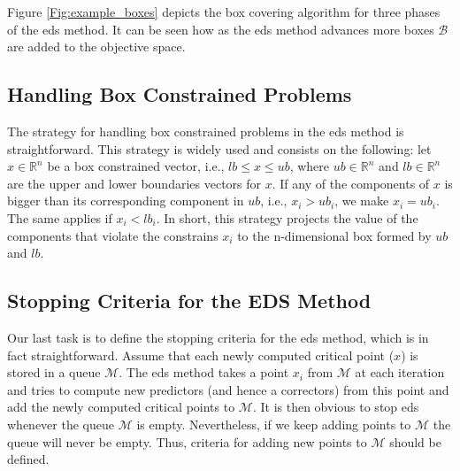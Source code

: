 Figure \ref{Fig:example_boxes} depicts the box covering algorithm for three phases of the eds method. It can be seen how as the \gls{eds} method advances more boxes $\mathcal{B}$ are added to the objective space.

\begin{comment}

\begin{figure}[H]
\hspace*{-1cm}
    \subfloat[Box set for 300th iteration \label{Fig:boxes1}]{%
    	\centering \texttt{[image: img/boxes1.png]}
    }
    \subfloat[Box set for 600th iteration \label{Fig:boxes2}]{%
    	\centering \texttt{[image: img/boxes2.png]}
    }
    \subfloat[Box set for end of the method\label{Fig:boxes3}]{%
    	\centering \texttt{[image: img/boxes3.png]}
    }
    \caption{Box set for different stages of the method}
    \label{Fig:example_boxes}
\end{figure}

\end{comment}

\subsection{Handling Box Constrained Problems}
\label{sec:box_constraints}

The strategy for handling box constrained problems in the \gls{eds} method is straightforward. This strategy is widely used and consists on the following: let $x \in \mathbb{R}^n$ be a box constrained vector, i.e., $lb \leq x \leq ub$, where $ub \in\mathbb{R}^n$ and $lb \in \mathbb{R}^n$ are the upper and lower boundaries vectors for $x$. If any of the components of $x$ is bigger than its corresponding component in $ub$, i.e., $x_i > ub_i$, we make $x_i = ub_i$. The same applies if $x_i < lb_i$. In short, this strategy projects the value of the components that violate the constrains $x_i$ to the n-dimensional box formed by $ub$ and $lb$.

\subsection{Stopping Criteria for the EDS Method}
\label{sec:stopping_criteria}

Our last task is to define the stopping criteria for the \gls{eds} method, which is in fact straightforward. Assume that each newly computed critical point ($x$) is stored in a queue $\mathcal{M}$. The \gls{eds} method takes a point $x_i$ from $\mathcal{M}$ at each iteration and tries to compute new predictors (and hence a correctors) from this point and add the newly computed critical points to $\mathcal{M}$. It is then obvious to stop \gls{eds} whenever the queue $\mathcal{M}$ is empty. Nevertheless, if we keep adding points to $\mathcal{M}$ the queue will never be empty. Thus, criteria for adding new points to $\mathcal{M}$ should be defined.\\

